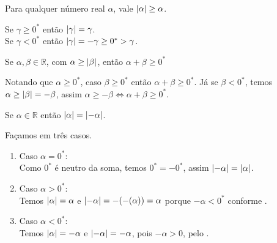 \documentclass[../main.tex]{subfiles}
\begin{document}
\begin{prop}
    Para qualquer número real $\alpha$, vale $\abs{\alpha} \geq \alpha$.
\end{prop}
\begin{dem}
    Se $\gamma \geq 0^*$ então $\abs{\gamma} = \gamma$.\\
    Se $\gamma < 0^*$ então $\abs{\gamma} = -\gamma \geq 0^* > \gamma$.
\end{dem}
\begin{prop}\label{reais-prop-somaMod}
    Se $\alpha, \beta \in \mathbb{R}$, com $\alpha \geq \abs{\beta}$, então $\alpha + \beta \geq 0^*$
\end{prop}
\begin{dem}
    Notando que $\alpha \geq 0^*$, caso $\beta \geq 0^*$ então $\alpha + \beta \geq 0^*$. Já se $\beta < 0^*$, temos $\alpha \geq \abs{\beta} = -\beta$, assim $\alpha \geq -\beta \iff \alpha + \beta \geq 0^*$.
\end{dem}

\begin{prop}\label{reais-prop-moduloDoMenos}
    Se $\alpha \in \mathbb{R}$ então $\abs{\alpha} = \abs{-\alpha}$.
\end{prop}
\begin{dem}
    Façamos em três casos.
    \begin{enumerate}[label=(\roman*)]
        \item Caso $\alpha = 0^*$: \\
        Como $0^*$ é neutro da soma, temos $0^* = -0^*$, assim $\abs{-\alpha} = \abs{\alpha}$.
        \item Caso $\alpha > 0^*$: \\
        Temos $\abs{\alpha} = \alpha$ e $\abs{-\alpha} = -(-(\alpha)) = \alpha$ porque $-\alpha < 0^*$ conforme .
        \item Caso $\alpha < 0^*$: \\
        Temos $\abs{\alpha} = -\alpha$ e $\abs{-\alpha} = -\alpha$, pois $-\alpha > 0$, pelo .
    \end{enumerate}
\end{dem}
\end{document}
